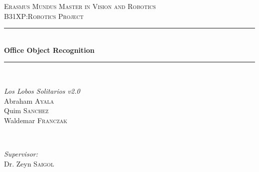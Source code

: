 \documentclass[fontsize=12pt]{article}
\begin{document}
\begin{titlepage}

\newcommand{\HRule}{\rule{\linewidth}{0.5mm}} %

\center %
 

\textsc{\LARGE Erasmus Mundus Master in Vision and Robotics}\\[1.5cm] %
\textsc{\Large B31XP:Robotics Project }\\[0.5cm] %


\HRule \\[0.4cm]
{ \huge \bfseries Office Object Recognition}\\[0.4cm] %
\HRule \\[1.5cm]
 

\begin{minipage}{0.4\textwidth}
\begin{flushleft} \large
\emph{Los Lobos Solitarios v2.0}\\
Abraham \textsc{Ayala} \\%
Quim \textsc{Sanchez}\\ %
Waldemar \textsc{Franczak}\\ %
\end{flushleft}
\end{minipage}
~
\begin{minipage}{0.4\textwidth}
\begin{flushright} \large
\emph{Supervisor:} \\
Dr. Zeyn \textsc{Saigol} %
\end{flushright}
\end{minipage}\\[4cm]


\end{titlepage}
\end{document}
